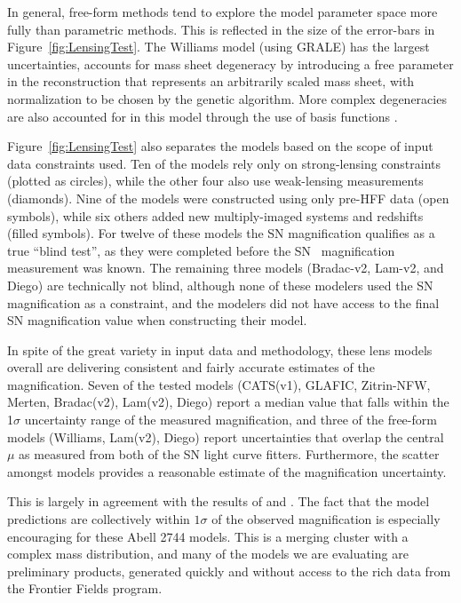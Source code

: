 In general, free-form methods tend to explore the model parameter
space more fully than parametric methods.  This is reflected in the
size of the error-bars in Figure~\ref{fig:LensingTest}.  The Williams
model (using GRALE) has the largest uncertainties,  accounts for mass sheet degeneracy by
introducing a free parameter in the reconstruction that represents an
arbitrarily scaled mass sheet, with normalization to be chosen by the
genetic algorithm.  More complex degeneracies are also accounted for
in this model through the use of basis
functions \citep{Liesenborgs:2006,Liesenborgs:2007,Mohammed:2014}. 


Figure~\ref{fig:LensingTest} also separates the models based on the
scope of input data constraints used.  Ten of the models rely only on
strong-lensing constraints (plotted as circles), while the other four
also use weak-lensing measurements (diamonds).  Nine of the models
were constructed using only pre-HFF data (open symbols), while six
others added new multiply-imaged systems and redshifts (filled symbols).
For twelve of these models the SN magnification qualifies as a true
``blind test'', as they were completed before the SN \tomas\
magnification measurement was known.  The remaining three models
(Bradac-v2, Lam-v2, and Diego) are technically not blind, although
none of these modelers used the SN magnification as a constraint, and
the modelers did not have access to the final SN magnification value
when constructing their model. 

In spite of the great variety in input data and methodology, these
lens models overall are delivering consistent and fairly accurate
estimates of the magnification.  Seven of the tested models (CATS(v1),
GLAFIC, Zitrin-NFW, Merten, Bradac(v2), Lam(v2), Diego) report a
median value that falls within the 1$\sigma$ uncertainty range of the
measured magnification, and three of the free-form models (Williams,
Lam(v2), Diego) report uncertainties that overlap the central $\mu$ as
measured from both of the SN light curve fitters.  Furthermore, the
scatter amongst models provides a reasonable estimate of the
magnification uncertainty.

This is largely in agreement with the results
of  and \citet{Nordin:2014}.  The fact that the
model predictions are collectively within $1\sigma$ of the observed
magnification is especially encouraging for these Abell 2744
models. This is a merging cluster with a complex mass distribution,
and many of the models we are evaluating are preliminary products,
generated quickly and without access to the rich data from the
Frontier Fields program.

